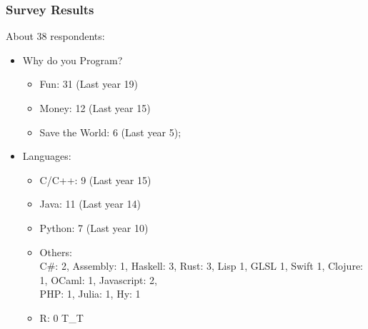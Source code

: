 \documentclass{beamer}
\begin{document}
\begin{frame}
  \frametitle{Survey Results}

  About 38 respondents:
  \begin{itemize}
  \item Why do you Program?
    \begin{itemize}
    \item Fun: 31 (Last year 19)
    \item Money: 12 (Last year 15)
    \item Save the World: 6 (Last year 5);
    \end{itemize}
    \bigskip
    
  \item Languages:
    \begin{itemize}
    \item C/C++: 9 (Last year 15)
    \item Java: 11 (Last year 14)
    \item Python: 7 (Last year 10)
      \medskip
      
    \item Others:\\
      C\#: 2, Assembly: 1, Haskell: 3, Rust: 3, Lisp 1,
      GLSL 1, Swift 1, Clojure: 1, OCaml: 1, Javascript: 2,\\
      PHP: 1, Julia: 1, Hy: 1
    \item R: 0   T\_T
    \end{itemize}
  \end{itemize}
\end{frame}
\end{document}

